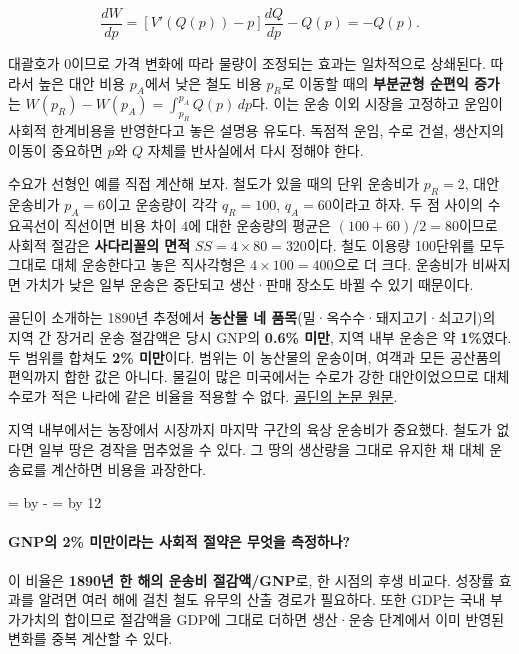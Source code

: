 \documentclass[10pt,a4paper]{article}
\newcommand{\ReserveQuestionSpace}{%
  \par\begingroup
  \dimen0=\pagegoal \advance\dimen0 by -\pagetotal
  \dimen2=\baselineskip \multiply\dimen2 by 12
  \ifdim\dimen0<\dimen2 \newpage\fi
  \endgroup}
\begin{document}
\[
\frac{dW}{dp}=[V'(Q(p))-p]\frac{dQ}{dp}-Q(p)=-Q(p).
\]

대괄호가 0이므로 가격 변화에 따라 물량이 조정되는 효과는 일차적으로 상쇄된다. 따라서 높은 대안 비용 $p_A$에서 낮은 철도 비용 $p_R$로 이동할 때의 \textbf{부분균형 순편익 증가}는 $W(p_R)-W(p_A)=\int_{p_R}^{p_A}Q(p)\,dp$다. 이는 운송 이외 시장을 고정하고 운임이 사회적 한계비용을 반영한다고 놓은 설명용 유도다. 독점적 운임, 수로 건설, 생산지의 이동이 중요하면 $p$와 $Q$ 자체를 반사실에서 다시 정해야 한다.\par

수요가 선형인 예를 직접 계산해 보자. 철도가 있을 때의 단위 운송비가 $p_R=2$, 대안 운송비가 $p_A=6$이고 운송량이 각각 $q_R=100$, $q_A=60$이라고 하자. 두 점 사이의 수요곡선이 직선이면 비용 차이 $4$에 대한 운송량의 평균은 $(100+60)/2=80$이므로 사회적 절감은 \textbf{사다리꼴의 면적} $SS=4\times80=320$이다. 철도 이용량 100단위를 모두 그대로 대체 운송한다고 놓은 직사각형은 $4\times100=400$으로 더 크다. 운송비가 비싸지면 가치가 낮은 일부 운송은 중단되고 생산·판매 장소도 바뀔 수 있기 때문이다.\par

골딘이 소개하는 1890년 추정에서 \textbf{농산물 네 품목}(밀·옥수수·돼지고기·쇠고기)의 지역 간 장거리 운송 절감액은 당시 GNP의 \textbf{0.6\% 미만}, 지역 내부 운송은 약 \textbf{1\%}였다. 두 범위를 합쳐도 \textbf{2\% 미만}이다. 범위는 이 농산물의 운송이며, 여객과 모든 공산품의 편익까지 합한 값은 아니다. 물길이 많은 미국에서는 수로가 강한 대안이었으므로 대체 수로가 적은 나라에 같은 비율을 적용할 수 없다. \href{https://goldin.scholars.harvard.edu/sites/g/files/omnuum5966/files/goldin/files/cliometrics.pdf}{골딘의 논문 원문}.\par

지역 내부에서는 농장에서 시장까지 마지막 구간의 육상 운송비가 중요했다. 철도가 없다면 일부 땅은 경작을 멈추었을 수 있다. 그 땅의 생산량을 그대로 유지한 채 대체 운송료를 계산하면 비용을 과장한다.\par

\ReserveQuestionSpace
\paragraph{GNP의 2\% 미만이라는 사회적 절약은 무엇을 측정하나?}
이 비율은 \textbf{1890년 한 해의 운송비 절감액/GNP}로, 한 시점의 후생 비교다. 성장률 효과를 알려면 여러 해에 걸친 철도 유무의 산출 경로가 필요하다. 또한 GDP는 국내 부가가치의 합이므로 절감액을 GDP에 그대로 더하면 생산·운송 단계에서 이미 반영된 변화를 중복 계산할 수 있다.\par
\end{document}
